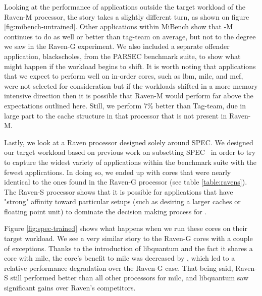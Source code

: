 
Looking at the performance of applications outside the target workload
of the Raven-M processor, the story takes a slightly different turn,
as shown on figure \ref{fig:mibench-untrained}.  Other applications
within MiBench show that \Ravan{}-M continues to do as well or better
than tag-team on average, but not to the degree we saw in the Raven-G
experiment. We also included a separate offender application,
blackscholes, from the PARSEC benchmark suite, to show what might
happen if the workload begins to shift. It is worth noting that
applications that we expect to perform well on in-order cores, such as
lbm, milc, and mcf, were not selected for consideration but if the
workloads shifted in a more memory intensive direction then it is
possible that Raven-M would perform far above the expectations
outlined here. Still, we perform 7\% better than Tag-team, due in
large part to the cache structure in that processor that is not
present in Raven-M.

Lastly, we look at a Raven processor designed solely around SPEC. We
designed our target workload based on previous work on subsetting
SPEC~\cite{subsettingSPEC} in order to try to capture the widest
variety of applications within the benchmark suite with the fewest
applications. In doing so, we ended up with cores that were nearly
identical to the ones found in the Raven-G processor (see table
\ref{table:ravens}). The Raven-S processor shows that it is possible
for applications that have "strong" affinity toward particular setups
(such as desiring a larger caches or floating point unit) to
dominate the decision making process for \blackBox{}.

Figure \ref{fig:spec-trained} shows what happens when we run these
cores on their target workload.  We see a very similar story to the
Raven-G cores with a couple of exceptions.  Thanks to the introduction
of libquantum and the fact it shares a core with milc, the core's
benefit to milc was decreased by \blackBox{}, which led to a relative
performance degradation over the Raven-G case. That being said,
Raven-S still performed better than all other processors for milc, and
libquantum saw significant gains over Raven's competitors.

